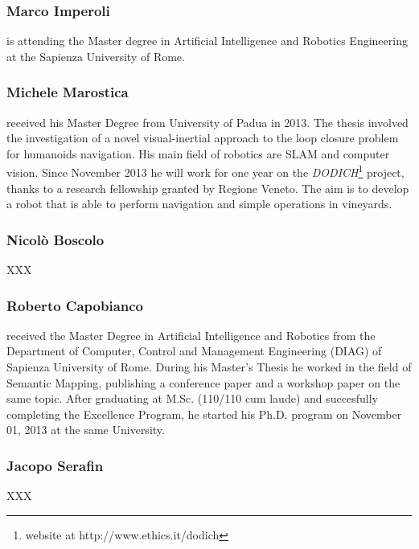 \documentclass[conference]{IEEEtran}
\begin{document}
\subsubsection{Marco Imperoli}
is attending the Master degree in Artificial Intelligence and Robotics Engineering at the Sapienza University of Rome.
\subsubsection{Michele Marostica}
received his Master Degree from University of Padua in 2013. The thesis involved the investigation of a novel visual-inertial approach to the loop closure problem for humanoids navigation. His main field of robotics are SLAM and computer vision.
Since November 2013 he will work for one year on the \textit{DODICH}\footnote{website at http://www.ethics.it/dodich} project, thanks to a research fellowship granted by Regione Veneto.
The aim is to develop a robot that is able to perform navigation and simple operations in vineyards.
\subsubsection{Nicolò Boscolo}
XXX
\subsubsection{Roberto Capobianco}
received the Master Degree in Artificial Intelligence and Robotics from the Department of Computer, 
Control and Management Engineering (DIAG) of Sapienza University of Rome. During his Master's Thesis he worked in the field of Semantic Mapping, publishing a conference paper and a workshop paper on the same topic. After graduating at M.Sc. (110/110 cum laude) and succesfully completing the Excellence Program, he started his Ph.D. program on November 01, 2013 at the same University. 
\subsubsection{Jacopo Serafin}
XXX
\end{document}
